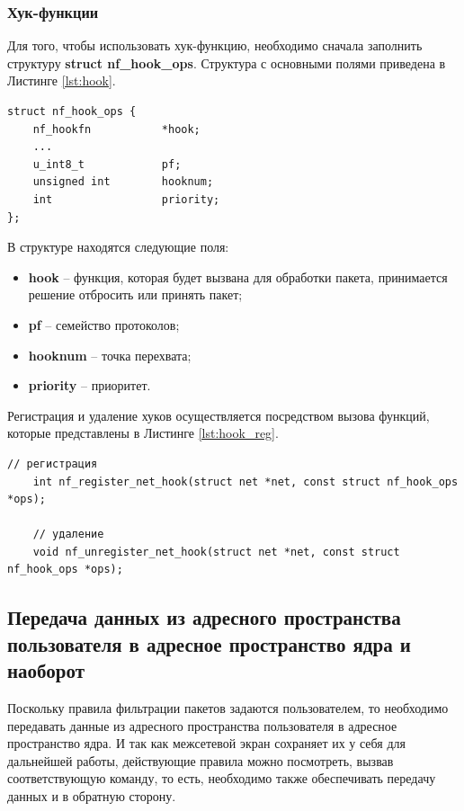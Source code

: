 \subsubsection{Хук-функции}
Для того, чтобы использовать хук-функцию, необходимо сначала заполнить структуру \textbf{struct nf\_hook\_ops}. Структура с основными полями приведена в Листинге \ref{lst:hook}.

\begin{lstlisting}[caption = {struct nf\_hook\_ops}, label=lst:hook]
struct nf_hook_ops {
	nf_hookfn			*hook;
	...
	u_int8_t			pf;
	unsigned int		hooknum;
	int					priority;
};
\end{lstlisting}

В структуре находятся следующие поля:
\begin{itemize}
	\item \textbf{hook} -- функция, которая будет вызвана для обработки пакета, принимается решение отбросить или принять пакет;
	
	\item \textbf{pf} -- семейство протоколов;
	
	\item \textbf{hooknum} -- точка перехвата;
	
	\item \textbf{priority} -- приоритет. \\
\end{itemize}

Регистрация и удаление хуков осуществляется посредством вызова функций, которые представлены в Листинге \ref{lst:hook_reg}.

\begin{lstlisting}[caption = {Функции для регистрации и удаления хук-функций}, label=lst:hook_reg]
	// регистрация
	int nf_register_net_hook(struct net *net, const struct nf_hook_ops *ops);
	
	// удаление
	void nf_unregister_net_hook(struct net *net, const struct nf_hook_ops *ops);
\end{lstlisting}


\subsection{Передача данных из адресного пространства пользователя в адресное пространство ядра и наоборот}
Поскольку правила фильтрации пакетов задаются пользователем, то необходимо передавать данные из адресного пространства пользователя в адресное пространство ядра. И так как межсетевой экран сохраняет их у себя для дальнейшей работы, действующие правила можно посмотреть, вызвав соответствующую команду, то есть, необходимо также обеспечивать передачу данных и в обратную сторону. 

